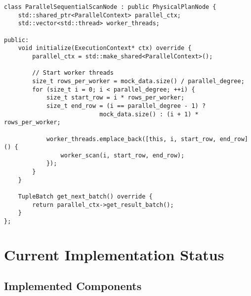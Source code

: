 \documentclass[12pt,a4paper]{article}
\begin{document}
    \begin{minipage}[H]{0.95\textwidth}
        \begin{lstlisting}[style=cpp, caption=Parallel Execution Implementation]
class ParallelSequentialScanNode : public PhysicalPlanNode {
    std::shared_ptr<ParallelContext> parallel_ctx;
    std::vector<std::thread> worker_threads;

public:
    void initialize(ExecutionContext* ctx) override {
        parallel_ctx = std::make_shared<ParallelContext>();

        // Start worker threads
        size_t rows_per_worker = mock_data.size() / parallel_degree;
        for (size_t i = 0; i < parallel_degree; ++i) {
            size_t start_row = i * rows_per_worker;
            size_t end_row = (i == parallel_degree - 1) ?
                           mock_data.size() : (i + 1) * rows_per_worker;

            worker_threads.emplace_back([this, i, start_row, end_row]() {
                worker_scan(i, start_row, end_row);
            });
        }
    }

    TupleBatch get_next_batch() override {
        return parallel_ctx->get_result_batch();
    }
};
        \end{lstlisting}
    \end{minipage}

    \section{Current Implementation Status}

    \subsection{Implemented Components}
\end{document}
